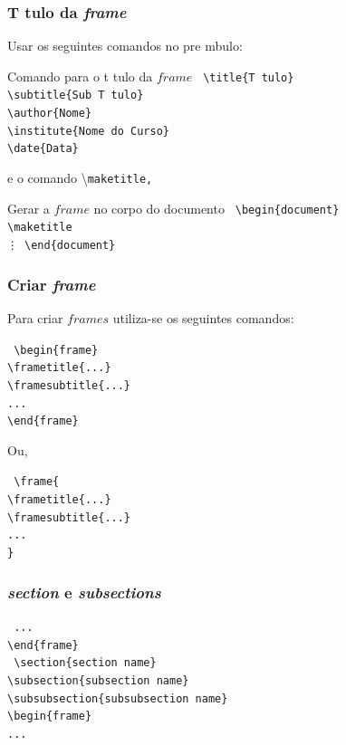 \documentclass{article}
\begin{document}
\begin{frame}
\frametitle{T tulo da \emph{frame}}
Usar os seguintes comandos no pre mbulo:
\begin{block}{Comando para o t tulo da $frame$}
\scriptsize{\tt{
\textbackslash title\{T tulo\} \\
\textbackslash subtitle\{Sub T tulo\} \\
\textbackslash author\{Nome\}\\
\textbackslash institute\{Nome do Curso\}\\
\textbackslash date\{Data\} \\
}}
\end{block}
e o comando \textbackslash \tt{maketitle}, 
\begin{block}{Gerar a $frame$ no corpo do documento}
\scriptsize{\tt{
\textbackslash begin\{document\} \\ 
\textbackslash maketitle\\ 
\vdots
\textbackslash end\{document\}\\
}}
\end{block}
\end{frame}

\begin{frame}
\frametitle{Criar \emph{frame}}
Para criar $frames$ utiliza-se os seguintes comandos:
\begin{block}{}
\scriptsize{\tt{
\textbackslash begin\{frame\} \\
\textbackslash frametitle\{...\} \\
\textbackslash framesubtitle\{...\} \\
...\\
\textbackslash end\{frame\}
}}
\end{block}
Ou, 
\begin{block}{}
\scriptsize{\tt{
\textbackslash frame\{ \\
\textbackslash frametitle\{...\}\\
\textbackslash framesubtitle\{...\}\\
...\\
\}
}}
\end{block}
\end{frame}

\begin{frame}
\frametitle{\emph{section} e \emph{subsections}}
\vspace{1cm}
\scriptsize{\tt{
...\\
\textbackslash end\{frame\}\\
\vspace{0.5cm}
\alert{
\textbackslash section\{section name\}\\
\textbackslash subsection\{subsection name\}\\
\textbackslash subsubsection\{subsubsection name\}}\\
\vspace{0.5cm}
\textbackslash begin\{frame\}\\
...\\
}
}
\end{frame}
\end{document}
